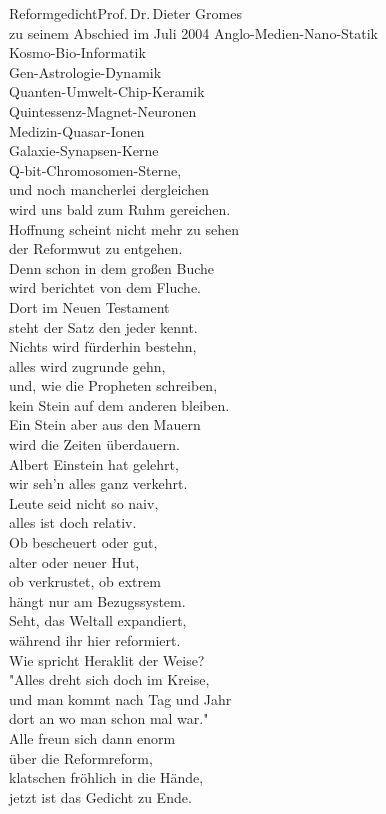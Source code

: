 \begin{lied*}{Reformgedicht}{Prof.\,Dr.\,Dieter Gromes\\zu seinem Abschied im Juli 2004}
Anglo-Medien-Nano-Statik\\
Kosmo-Bio-Informatik\\
Gen-Astrologie-Dynamik\\
Quanten-Umwelt-Chip-Keramik\\
Quintessenz-Magnet-Neuronen\\
Medizin-Quasar-Ionen\\
Galaxie-Synapsen-Kerne\\
Q-bit-Chromosomen-Sterne,\\
und noch mancherlei dergleichen\\
wird uns bald zum Ruhm gereichen.\\

Hoffnung scheint nicht mehr zu sehen\\
der Reformwut zu entgehen.\\
Denn schon in dem großen Buche\\
wird berichtet von dem Fluche.\\
Dort im Neuen Testament\\
steht der Satz den jeder kennt.\\
Nichts wird fürderhin bestehn,\\
alles wird zugrunde gehn,\\
und, wie die Propheten schreiben,\\
kein Stein auf dem anderen bleiben.\\

Ein Stein aber aus den Mauern\\
wird die Zeiten überdauern.\\
Albert Einstein hat gelehrt,\\
wir seh'n alles ganz verkehrt.\\
Leute seid nicht so naiv,\\
alles ist doch relativ.\\
Ob bescheuert oder gut,\\
alter oder neuer Hut,\\
ob verkrustet, ob extrem\\
hängt nur am Bezugssystem.\\

Seht, das Weltall expandiert,\\
während ihr hier reformiert.\\
Wie spricht Heraklit der Weise?\\
"Alles dreht sich doch im Kreise,\\
und man kommt nach Tag und Jahr\\
dort an wo man schon mal war."\\

Alle freun sich dann enorm\\
über die Reformreform,\\
klatschen fröhlich in die Hände,\\
jetzt ist das Gedicht zu Ende.\\
\end{lied*}

